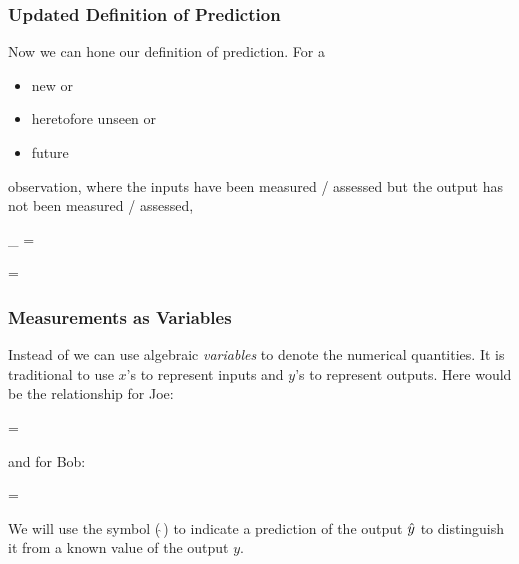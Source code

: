 \documentclass[slides]{beamer} %
\begin{document}
\begin{frame}\frametitle{Updated Definition of Prediction}

\small 
Now we can hone our definition of prediction. For a 

\begin{itemize}
\item new or
\item heretofore unseen or
\item future
\end{itemize}

observation, where the inputs have been measured / assessed but the output has not been measured / assessed,

\beqn
{}_{} = 
\eeqn

\tiny 
\beqn
{} = 
\eeqn
\normalsize


\end{frame}


\begin{frame}\frametitle{Measurements as Variables}

Instead of  we can use algebraic \textit{variables} to denote the numerical quantities. It is traditional to use $x$'s to represent inputs and $y$'s to represent outputs. Here would be the relationship for Joe:


\beqn
{} = 
\eeqn

and for Bob:


\beqn
{} = 
\eeqn

We will use the  symbol ($\hat{~}$) to indicate a prediction of the output $\hat{y}$ to distinguish it from a known value of the output $y$.

\end{frame}
\end{document}
